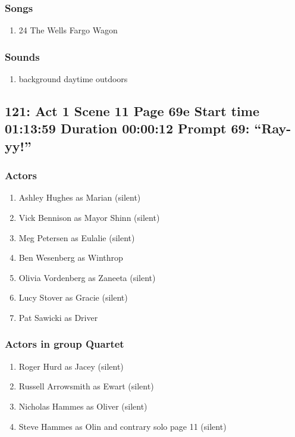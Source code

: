 \subsubsection{Songs}
\begin{enumerate}
\item 24 The Wells Fargo Wagon
\end{enumerate}\subsubsection{Sounds}
\begin{enumerate}
\item background daytime outdoors
\end{enumerate}
\subsection{121: Act 1 Scene 11 Page 69e Start time 01:13:59 Duration 00:00:12 Prompt 69: ``Ray-yy!''}

\subsubsection{Actors}
\begin{enumerate}
\item Ashley Hughes as Marian (silent)
\item Vick Bennison as Mayor Shinn (silent)
\item Meg Petersen as Eulalie (silent)
\item Ben Wesenberg as Winthrop
\item Olivia Vordenberg as Zaneeta (silent)
\item Lucy Stover as Gracie (silent)
\item Pat Sawicki as Driver
\end{enumerate}
\subsubsection{Actors in group Quartet}
\begin{enumerate}
\item Roger Hurd as Jacey (silent)
\item Russell Arrowsmith as Ewart (silent)
\item Nicholas Hammes as Oliver (silent)
\item Steve Hammes as Olin and contrary solo page 11 (silent)
\end{enumerate}
